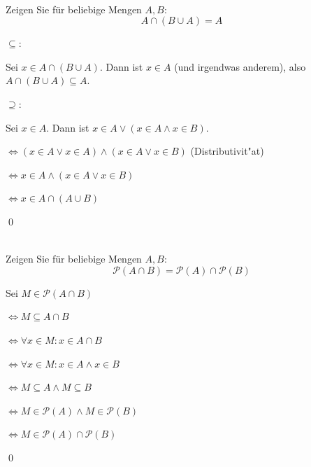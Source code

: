 \\
Zeigen Sie für beliebige Mengen $A,B$:
\[A\cap (B\cup A)=A\]

\begin{loesung}
\glqq$\subseteq$\grqq:

Sei $x\in A\cap(B\cup A)$. Dann ist $x\in A$ (und irgendwas anderem), also $A\cap(B\cup A)\subseteq A$.

\glqq$\supseteq$\grqq:

Sei $x\in A$. Dann ist $x\in A\vee (x\in A\wedge x\in B)$.

$\Leftrightarrow (x\in A\vee x\in A)\wedge (x\in A\vee x\in B)$ (Distributivit"at)

$\Leftrightarrow x\in A\wedge (x\in A\vee x\in B)$

$\Leftrightarrow x\in A\cap(A\cup B)$

\qed
\end{loesung}
\\
Zeigen Sie für beliebige Mengen $A,B$:
\[\mathscr{P}(A\cap B)=\mathscr{P}(A)\cap\mathscr{P}(B)\]

\begin{loesung}
Sei $M\in\mathscr{P}(A\cap B)$

$\Leftrightarrow M\subseteq A\cap B$

$\Leftrightarrow \forall x\in M:x\in A\cap B$

$\Leftrightarrow \forall x\in M: x\in A\wedge x\in B$

$\Leftrightarrow M\subseteq A\wedge M\subseteq B$

$\Leftrightarrow M\in\mathscr{P}(A)\wedge M\in\mathscr{P}(B)$

$\Leftrightarrow M\in\mathscr{P}(A)\cap\mathscr{P}(B)$

\qed
\end{loesung}

